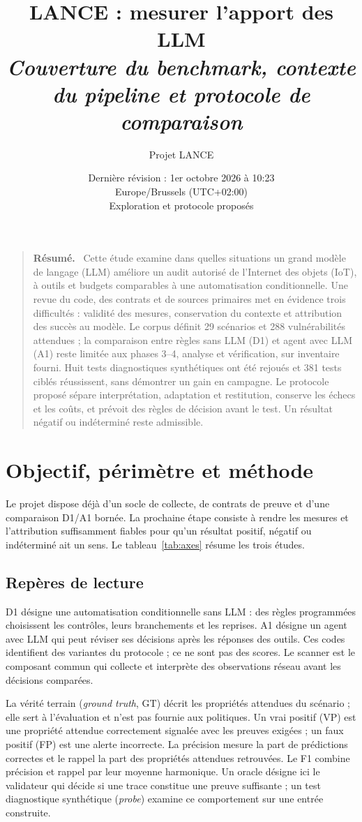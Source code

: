 \documentclass[11pt,a4paper]{article}
\title{\bfseries LANCE : mesurer l'apport des LLM\\[0.5em]\large\mdseries\itshape Couverture du benchmark, contexte du pipeline et protocole de comparaison}
\author{Projet LANCE}
\date{Dernière révision : 1er octobre 2026 à 10:23\\[0.15em]\small Europe/Brussels (UTC+02:00)\\[0.4em]\small Exploration et protocole proposés}
\renewenvironment{abstract}
  {\begin{quote}\small\noindent\textbf{Résumé.}\ }
  {\par\end{quote}}
\begin{document}
\maketitle
\begin{abstract}
Cette étude examine dans quelles situations un grand modèle de langage (LLM) améliore un audit autorisé de l'Internet des objets (IoT), à outils et budgets comparables à une automatisation conditionnelle. Une revue du code, des contrats et de sources primaires met en évidence trois difficultés : validité des mesures, conservation du contexte et attribution des succès au modèle. Le corpus définit 29 scénarios et 288 vulnérabilités attendues ; la comparaison entre règles sans LLM (D1) et agent avec LLM (A1) reste limitée aux phases 3--4, analyse et vérification, sur inventaire fourni. Huit tests diagnostiques synthétiques ont été rejoués et 381 tests ciblés réussissent, sans démontrer un gain en campagne. Le protocole proposé sépare interprétation, adaptation et restitution, conserve les échecs et les coûts, et prévoit des règles de décision avant le test. Un résultat négatif ou indéterminé reste admissible.
\end{abstract}
\clearpage

\begingroup
\small
\tableofcontents
\endgroup
\clearpage

\section{Objectif, périmètre et méthode}
Le projet dispose déjà d'un socle de collecte, de contrats de preuve et d'une
comparaison D1/A1 bornée. La prochaine étape consiste à rendre les mesures et
l'attribution suffisamment fiables pour qu'un résultat positif, négatif ou
indéterminé ait un sens. Le tableau~\ref{tab:axes} résume les trois études.

\subsection{Repères de lecture}
D1 désigne une automatisation conditionnelle sans LLM : des règles programmées
choisissent les contrôles, leurs branchements et les reprises. A1 désigne un
agent avec LLM qui peut réviser ses décisions après les réponses des outils.
Ces codes identifient des variantes du protocole ; ce ne sont pas des scores.
Le scanner est le composant commun qui collecte et interprète des observations
réseau avant les décisions comparées.

La vérité terrain (\emph{ground truth}, GT) décrit les propriétés attendues du
scénario ; elle sert à l'évaluation et n'est pas fournie aux politiques.
Un vrai positif (VP) est une propriété attendue correctement signalée avec les
preuves exigées ; un faux positif (FP) est une alerte incorrecte.
La précision mesure la part de prédictions correctes et le rappel la part des
propriétés attendues retrouvées. Le F1 combine précision et rappel par leur
moyenne harmonique. Un oracle désigne ici le validateur qui décide si une trace
constitue une preuve suffisante ; un test diagnostique synthétique
(\emph{probe}) examine ce comportement sur une entrée construite.
\end{document}
